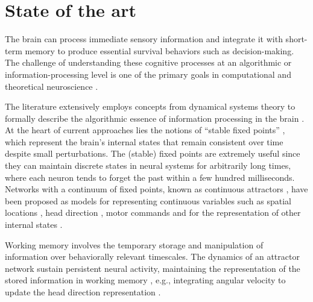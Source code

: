 \documentclass[12pt,letterpaper, onecolumn]{article}
\theoremstyle{definition}
\theoremstyle{remark}
\begin{document}
\newpage
\section{State of the art}

The brain can process immediate sensory information and integrate it with short-term memory to produce essential survival behaviors such as decision-making.
The challenge of understanding these cognitive processes at an algorithmic or information-processing level is one of the primary goals in computational and theoretical neuroscience \citep{zoltowski2020general, pagan2022, whiteway2019, dyer2023simplest}.

The literature extensively employs concepts from dynamical systems theory to formally describe the algorithmic essence of information processing in the brain \citep{vyas2020computation}.
At the heart of current approaches lies the notions of ``stable fixed points'' \citep{sussillo2013blackbox, sussillo2014, beer2018, maheswaranathan2019universality, driscoll2022, mante2013context}, which represent the brain's internal states that remain consistent over time despite small perturbations.
The (stable) fixed points are extremely useful since they can maintain discrete states in neural systems for arbitrarily long times, where each neuron tends to forget the past within a few hundred milliseconds. %
Networks with a continuum of fixed points, known as continuous attractors \citep{fung2010, khona2022, wu2008, wu2016}, have been proposed as models for representing continuous variables such as spatial locations \citep{samsonovich1997, stringer2002placecells, yang2022, wimmer2014, guanella2007model, gardner2022toroidal}, head direction \citep{stringer2002headdirection, hulse2020, turner2017, turner2020neuroanatomical, vafidis2022, kim2019generation}, motor commands \citep{stringer2003} and for the representation of other internal states \citep{nair2023, branco2016, seung2000stability}.

Working memory involves the temporary storage and manipulation of information over behaviorally relevant timescales. The dynamics of an attractor network sustain persistent neural activity, maintaining the representation of the stored information in working memory \citep{koulakov2002}, e.g., integrating angular velocity to update the head direction representation \citep{barak2013, barak2014, durstewitz2000, wolpert1995, goncalves2014, burak2009, goldman2007, aksay2007, noorman2022, cueva2021a, cueva2021b}.
\end{document}
